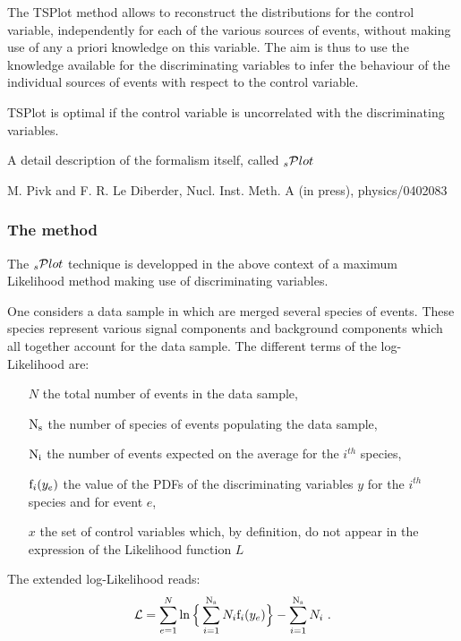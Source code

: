 \documentclass[11pt]{article}
\begin{document}
The TSPlot method allows to reconstruct the distributions for
the control variable, independently for each of the various sources of
events, without making use of any a priori knowledge on this
variable. The aim is thus to use the knowledge available for the
discriminating variables to infer the behaviour of the individual
sources of events with respect to the control variable.



TSPlot is optimal if the control variable is uncorrelated with the discriminating variables.




A detail description of the formalism itself, called 
 $\hbox{$_s$}{\cal P}lot$
 

M. Pivk and F. R. Le Diberder, Nucl. Inst. Meth. A (in press), physics/0402083




\subsubsection{The method}




The  $\hbox{$_s$}{\cal P}lot$ technique is developped in the above context of a maximum Likelihood method making use of discriminating variables.



One considers a data sample in which are merged several species
of events. These species represent various signal components and
background components which all together account for the data sample.
The different terms of the log-Likelihood are:

\begin{itemize}
 \item[$N$] the total number of events in the data sample,
 \item[${\rm N}_{\rm s}$] the number of species of events populating the data sample,
 \item[${\rm N}_{\rm i}$] the number of events expected on the average for the $i^{th}$ species,
 \item[${\rm f}_i(y_e)$] the value of the PDFs of the discriminating variables $y$ for the $i^{th}$ species and for event $e$, 
 \item[$x$] the set of control variables which, by definition, do not appear in the expression of the Likelihood function $L$
\end{itemize}

The extended log-Likelihood reads:
 \begin{equation}
{\cal L}=\sum_{e=1}^{N}\ln \Big\{ \sum_{i=1}^{{\rm N}_{\rm s}}N_i{\rm f}_i(y_e) \Big\} -\sum_{i=1}^{{\rm N}_{\rm s}}N_i ~.
\end{equation}
\end{document}
